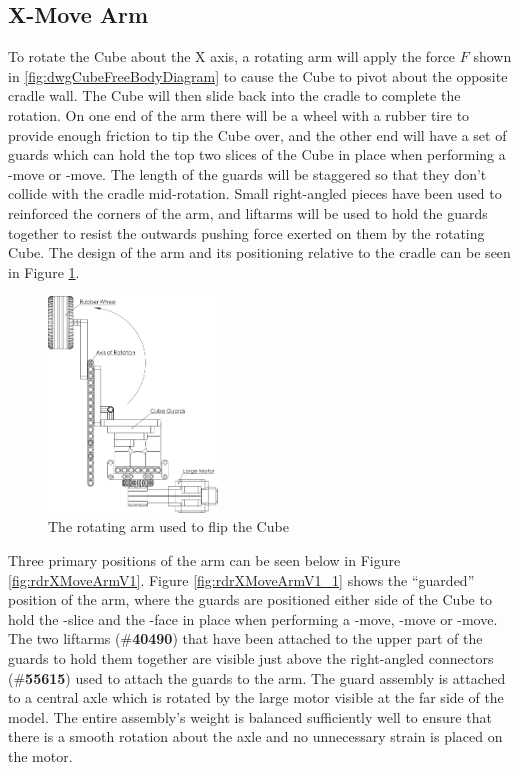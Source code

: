 \documentclass{report}
\newcommand{\tbo}[1]{\textbf{#1}}
\newcommand{\legopiece}[1]{(\#\tbo{#1})}
\newcommand{\face}[1]{\uppercase{\texttt{\formatmovesnospace{#1}}}-face}
\newcommand{\move}[1]{\uppercase{\texttt{\formatmovesnospace{#1}}}-move}
\newcommand{\slice}[1]{\uppercase{\texttt{\formatmovesnospace{#1}}}-slice}
\begin{document}
    \subsection{X-Move Arm}
    
    To rotate the Cube about the X axis, a rotating arm will apply the force $F$ shown in \ref{fig:dwgCubeFreeBodyDiagram} to cause the Cube to pivot about the opposite cradle wall. The Cube will then slide back into the cradle to complete the rotation. On one end of the arm there will be a wheel with a rubber tire to provide enough friction to tip the Cube over, and the other end will have a set of guards which can hold the top two slices of the Cube in place when performing a \move{D} or \move{d'}. The length of the guards will be staggered so that they don't collide with the cradle mid-rotation. Small right-angled pieces have been used to reinforced the corners of the arm, and liftarms will be used to hold the guards together to resist the outwards pushing force exerted on them by the rotating Cube. The design of the arm and its positioning relative to the cradle can be seen in Figure \ref{fig:dwgRotatingArm}.
    
    \begin{figure}[H]
    	\begin{center}
    		\includegraphics[width=0.4\textwidth]{Resources/Images/dwgRotatingArm.png}
    		\caption{The rotating arm used to flip the Cube}
    		\label{fig:dwgRotatingArm}
    	\end{center}
    \end{figure}

	Three primary positions of the arm can be seen below in Figure \ref{fig:rdrXMoveArmV1}. Figure \ref{fig:rdrXMoveArmV1_1} shows the \enquote{guarded} position of the arm, where the guards are positioned either side of the Cube to hold the \slice{l-r} and the \face{U} in place when performing a \move{D}, \move{D'} or \move{D2}. The two liftarms \legopiece{40490} that have been attached to the upper part of the guards to hold them together are visible just above the right-angled connectors \legopiece{55615} used to attach the guards to the arm. The guard assembly is attached to a central axle which is rotated by the large motor visible at the far side of the model. The entire assembly's weight is balanced sufficiently well to ensure that there is a smooth rotation about the axle and no unnecessary strain is placed on the motor.
\end{document}
